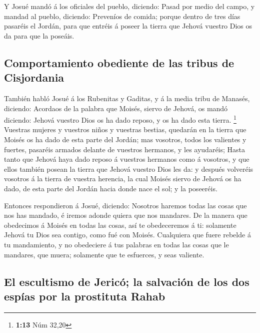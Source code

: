  Y Josué mandó á los oficiales del pueblo, diciendo:
 Pasad por medio del campo, y mandad al pueblo, diciendo:
Preveníos de comida; porque dentro de tres días pasaréis el Jordán, para
que entréis á poseer la tierra que Jehová vuestro Dios os da para que la
poseáis.

\hypertarget{comportamiento-obediente-de-las-tribus-de-cisjordania}{%
\subsection{Comportamiento obediente de las tribus de
Cisjordania}\label{comportamiento-obediente-de-las-tribus-de-cisjordania}}

 También habló Josué á los Rubenitas y Gaditas, y á la
media tribu de Manasés, diciendo:  Acordaos de la palabra
que Moisés, siervo de Jehová, os mandó diciendo: Jehová vuestro Dios os
ha dado reposo, y os ha dado esta tierra. \footnote{\textbf{1:13} Núm
  32,20}  Vuestras mujeres y vuestros niños y vuestras
bestias, quedarán en la tierra que Moisés os ha dado de esta parte del
Jordán; mas vosotros, todos los valientes y fuertes, pasaréis armados
delante de vuestros hermanos, y les ayudaréis;  Hasta
tanto que Jehová haya dado reposo á vuestros hermanos como á vosotros, y
que ellos también posean la tierra que Jehová vuestro Dios les da: y
después volveréis vosotros á la tierra de vuestra herencia, la cual
Moisés siervo de Jehová os ha dado, de esta parte del Jordán hacia donde
nace el sol; y la poseeréis.

 Entonces respondieron á Josué, diciendo: Nosotros
haremos todas las cosas que nos has mandado, é iremos adonde quiera que
nos mandares.  De la manera que obedecimos á Moisés en
todas las cosas, así te obedeceremos á ti: solamente Jehová tu Dios sea
contigo, como fué con Moisés.  Cualquiera que fuere
rebelde á tu mandamiento, y no obedeciere á tus palabras en todas las
cosas que le mandares, que muera; solamente que te esfuerces, y seas
valiente.

\hypertarget{el-escultismo-de-jericuxf3-la-salvaciuxf3n-de-los-dos-espuxedas-por-la-prostituta-rahab}{%
\subsection{El escultismo de Jericó; la salvación de los dos espías por
la prostituta
Rahab}\label{el-escultismo-de-jericuxf3-la-salvaciuxf3n-de-los-dos-espuxedas-por-la-prostituta-rahab}}

